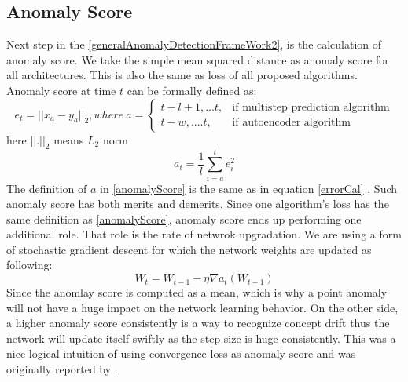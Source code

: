 \documentclass[12pt]{article}
\begin{document}
\subsection{Anomaly Score}
Next step in the \ref{generalAnomalyDetectionFrameWork2}, is the calculation of anomaly score. We take the simple mean squared distance as anomaly score for all architectures. This is also the same as loss of all proposed algorithms. Anomaly score at time $t$ can be formally defined as:
\begin{equation}
	e_{t} = ||x_{a} - y_{a}||_2, where \: a =  
	    \begin{cases}
      t-l+1,...t, & \text{if multistep prediction algorithm}\\
      t-w,....t, & \text{if autoencoder algorithm }
    \end{cases}
    \label{errorCal}
\end{equation}
here $||.||_2$ means $L_2$ norm
\begin{equation}
a_{t} = \frac{1}{l} \sum_{i = a}^{t} e_{i}^{2}
	\label{anomalyScore}
\end{equation}
The definition of $a$ in \ref{anomalyScore} is the same as in equation \ref{errorCal} . Such anomaly score has both merits and demerits. Since one algorithm's loss has the same definition as \ref{anomalyScore}, anomaly score ends up performing one additional role. That role is the rate of netwrok upgradation. We are using a form of stochastic gradient descent for which the network weights are updated as following:
\begin{equation}
W_t = W_{t-1} - \eta \nabla a_t (W_{t-1})
\end{equation}
Since the anomlay score is computed as a mean, which is why a point anomaly will not have a huge impact on the network learning behavior. On the other side, a higher anomaly score consistently is a way to recognize concept drift thus the network will update itself swiftly as the step size is huge consistently. This was a nice logical intuition of using convergence loss as anomaly score and was originally reported by \cite{stackedLstmSecond}.\\
\break
\end{document}
